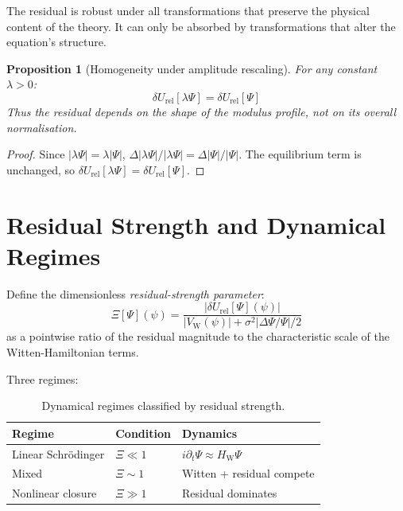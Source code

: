 \documentclass[12pt]{article}
\newtheorem{proposition}[theorem]{Proposition}
\newcommand{\VW}{V_{\mathrm{W}}}
\newcommand{\HW}{H_{\mathrm{W}}}
\newcommand{\dUrel}{\delta U_{\mathrm{rel}}}
\begin{document}
The residual is robust under all transformations that preserve the physical content of the theory. It can only be absorbed by transformations that alter the equation's structure.

\begin{proposition}[Homogeneity under amplitude rescaling]\label{prop:homogeneity}
For any constant $\lambda > 0$:
\begin{equation}
    \dUrel[\lambda\Psi] = \dUrel[\Psi]
\end{equation}
Thus the residual depends on the shape of the modulus profile, not on its overall normalisation.
\end{proposition}

\begin{proof}
Since $|\lambda\Psi| = \lambda|\Psi|$, $\Delta|\lambda\Psi|/|\lambda\Psi| = \Delta|\Psi|/|\Psi|$. The equilibrium term is unchanged, so $\dUrel[\lambda\Psi] = \dUrel[\Psi]$.
\end{proof}

\section{Residual Strength and Dynamical Regimes}\label{sec:regimes}

Define the dimensionless \textit{residual-strength parameter}:
\begin{equation}\label{eq:Xi}
    \Xi[\Psi](\psi) = \frac{|\dUrel[\Psi](\psi)|}{|\VW(\psi)| + \sigma^2|\Delta\Psi/\Psi|/2}
\end{equation}
as a pointwise ratio of the residual magnitude to the characteristic scale of the Witten-Hamiltonian terms.

Three regimes:

\begin{table}[ht]
\centering
\caption{Dynamical regimes classified by residual strength.}
\label{tab:regimes}
\begin{tabular}{@{}lll@{}}
\toprule
Regime & Condition & Dynamics \\
\midrule
Linear Schr\"odinger & $\Xi \ll 1$ & $i\partial_t\Psi \approx \HW\Psi$ \\
Mixed & $\Xi \sim 1$ & Witten + residual compete \\
Nonlinear closure & $\Xi \gg 1$ & Residual dominates \\
\bottomrule
\end{tabular}
\end{table}
\end{document}
